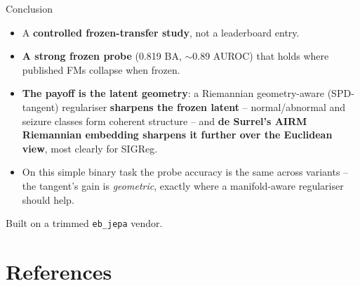 \documentclass[aspectratio=169]{beamer}
\newcommand{\ba}{0.819}                %
\newcommand{\aurocv}{0.89}             %
\begin{document}
\begin{frame}{Conclusion}
  \vspace{0.8em}
  \begin{itemize}
    \item A \textbf{controlled frozen-transfer study}, not a leaderboard entry.
    \item \textbf{A strong frozen probe} (\ba{} BA, $\sim$\aurocv{} AUROC) that holds where published FMs collapse when frozen.
    \item \textbf{The payoff is the latent geometry}: a Riemannian geometry-aware (SPD-tangent) regulariser \textbf{sharpens the frozen latent} -- normal/abnormal and seizure classes form coherent structure -- and \textbf{de Surrel's AIRM Riemannian embedding sharpens it further over the Euclidean view}, most clearly for SIGReg.
    \item On this simple binary task the probe accuracy is the same across variants -- the tangent's gain is \emph{geometric}, exactly where a manifold-aware regulariser should help.
  \end{itemize}
  \vspace{1.0em}
  \begin{center}
    \large Built on a trimmed \texttt{eb\_jepa} vendor.
  \end{center}
\end{frame}

\section{References}
\end{document}
